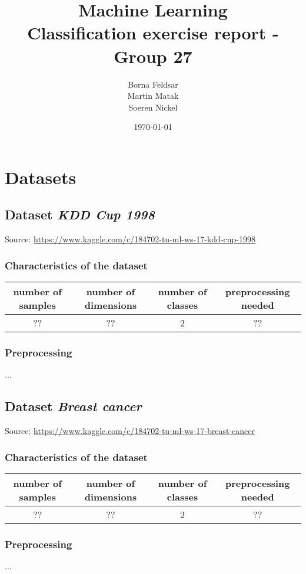 \documentclass[11pt,a4paper,titlepage]{article}
\title{\blue Machine Learning \\
\blueb Classification exercise report - Group 27}
\author{Borna Feldsar \\ Martin Matak \\ Soeren Nickel}
\date{\today}
\begin{document}
\maketitle


\section{Datasets}

\subsection{Dataset \textit{KDD Cup 1998}}
Source: \url{https://www.kaggle.com/c/184702-tu-ml-ws-17-kdd-cup-1998}
\subsubsection{Characteristics of the dataset}
\begin{center}
  \begin{tabular}{| c | c | c | c |}
    \hline
    number of samples & number of dimensions & number of classes & preprocessing needed \\ \hline
    ?? & ?? & 2 & ?? \\
    \hline
  \end{tabular}
\end{center}
\subsubsection{Preprocessing}
...

\subsection{Dataset \textit{Breast cancer}}
Source: \url{https://www.kaggle.com/c/184702-tu-ml-ws-17-breast-cancer}
\subsubsection{Characteristics of the dataset}
\begin{center}
  \begin{tabular}{| c | c | c | c |}
    \hline
    number of samples & number of dimensions & number of classes & preprocessing needed \\ \hline
    ?? & ?? & 2 & ??\\
    \hline
  \end{tabular}
\end{center}
\subsubsection{Preprocessing}
...
\end{document}

